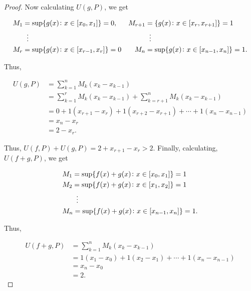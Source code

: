 \documentclass{article}
\theoremstyle{definition}
\theoremstyle{remark}
\theoremstyle{definition}
\begin{document}
\begin{enumerate}[leftmargin=*]
\begin{proof}
    \noindent Now calculating $U(g,P)$, we get
    
    \begin{align*}
        M_1&=\sup\{g(x)\colon x\in[x_0,x_1]\}=0, & M_{r+1}&=\{g(x)\colon x\in[x_{r},x_{r+1}]\} = 1 \\ 
        &\hspace{2mm}\vdots & &\hspace{2mm}\vdots \\
        M_{r}&=\sup\{g(x)\colon x\in[x_{r-1},x_r]\}=0 & M_n&=\sup\{g(x)\colon x\in[x_{n-1},x_n]\}=1.
    \end{align*}
    
    \noindent Thus,
    
    \begin{equation*}
        \begin{split}
            U(g,P) &= \sum_{k=1}^n M_k(x_k-x_{k-1}) \\
            &= \sum_{k=1}^r M_k(x_k-x_{k-1}) +\sum_{k=r+1}^n M_k(x_k-x_{k-1}) \\
            &= 0+1(x_{r+1}-x_r)+1(x_{r+2}-x_{r+1})+\cdots+1(x_n-x_{n-1}) \\
            &= x_n-x_r \\
            &= 2-x_r.
        \end{split}
    \end{equation*}
    
    \noindent Thus, $U(f,P)+U(g,P)=2+x_{r+1}-x_r>2$. Finally, calculating, $U(f+g,P)$, we get 
    
    \begin{equation*}
        \begin{split}
            &M_1=\sup\{f(x)+g(x)\colon x\in[x_0,x_1]\} = 1 \\
            &M_2=\sup\{f(x)+g(x)\colon x\in[x_1,x_2]\}=1 \\
            &\hspace{7mm}\vdots \\
            &M_n=\sup\{f(x)+g(x)\colon x\in[x_{n-1},x_n]\}=1.
        \end{split}
    \end{equation*}
    
    \noindent Thus, 
    
    \begin{equation*}
        \begin{split}
            U(f+g,P)&=\sum_{k=1}^n M_k(x_k-x_{k-1}) \\
            &= 1(x_1-x_0)+1(x_2-x_1)+\cdots+1(x_n-x_{n-1}) \\
            &= x_n-x_0 \\
            &= 2.
        \end{split}
    \end{equation*}
    

\end{proof}
\end{enumerate}
\end{document}
